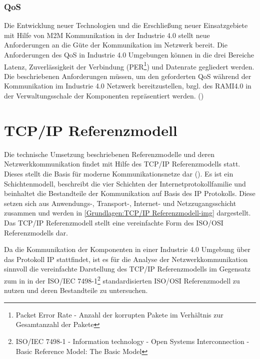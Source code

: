 \subsubsection{\ac{QoS}}
Die Entwicklung neuer Technologien und die Erschließung neuer Einsatzgebiete mit Hilfe von \ac{M2M} Kommunikation in der Industrie 4.0 stellt neue Anforderungen an die Güte der Kommunikation im Netzwerk bereit. Die Anforderungen des \ac{QoS} in Industrie 4.0 Umgebungen können in die drei Bereiche Latenz, Zuverlässigkeit der Verbindung (\ac{PER}\footnote{Packet Error Rate - Anzahl der korrupten Pakete im Verhältnis zur Gesamtanzahl der Pakete}) und Datenrate gegliedert werden. Die beschriebenen Anforderungen müssen, um den geforderten \ac{QoS} während der Kommunikation im Industrie 4.0 Netzwerk bereitzustellen, bzgl. des \ac{RAMI4.0} in der Verwaltungsschale der Komponenten repräsentiert werden. (\cite{BMWiNeCon2016})

\section{\ac{TCP}/\ac{IP} Referenzmodell}
\label{Grundlagen:TCP/IP Referenzmodell}
Die technische Umsetzung beschriebenen Referenzmodelle und deren Netzwerkkommunikation findet mit Hilfe des \ac{TCP}/\ac{IP} Referenzmodells statt. Dieses stellt die Basis für moderne Kommunikationsnetze dar (\cite{sichKom2017}). Es ist ein Schichtenmodell, beschreibt die vier Schichten der Internetprotokollfamilie und beinhaltet die Bestandteile der Kommunikation auf Basis des \ac{IP} Protokolls. Diese setzen sich aus Anwendungs-, Transport-, Internet- und Netzzugangsschicht zusammen und werden in \autoref{Grundlagen:TCP/IP Referenzmodell-img} dargestellt. Das \ac{TCP}/\ac{IP} Referenzmodell stellt eine vereinfachte Form des \ac{ISO}/\ac{OSI} Referenzmodells dar.

Da die Kommunikation der Komponenten in einer Industrie 4.0 Umgebung über das Protokoll \ac{IP} stattfindet, ist es für die Analyse der Netzwerkkommunikation sinnvoll die vereinfachte Darstellung des \ac{TCP}/\ac{IP} Referenzmodells im Gegensatz zum in in der \ac{ISO}/\ac{IEC} 7498-1\footnote{ISO/IEC 7498-1 - Information technology - Open Systems Interconnection - Basic Reference Model: The Basic Model} standardisierten \ac{ISO}/\ac{OSI} Referenzmodell zu nutzen und deren Bestandteile zu untersuchen.

